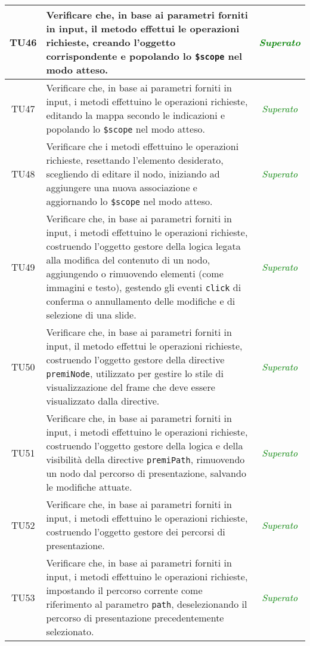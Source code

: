 \begin{longtable}{|c|>{}m{8cm}|c|}
\hypertarget{TU46}{TU46} & Verificare che, in base ai parametri forniti in input, il metodo effettui le operazioni richieste, creando l'oggetto corrispondente e popolando lo \texttt{\$scope} nel modo atteso\finaleTestUnita{}. & \textcolor{Green}{\textit{Superato}}\\ \hline
\hypertarget{TU47}{TU47} & Verificare che, in base ai parametri forniti in input, i metodi effettuino le operazioni richieste, editando la mappa secondo le indicazioni e popolando lo \texttt{\$scope} nel modo atteso\finaleTestUnita{}. & \textcolor{Green}{\textit{Superato}}\\ \hline
\hypertarget{TU48}{TU48} & Verificare che i metodi effettuino le operazioni richieste, resettando l'elemento desiderato, scegliendo di editare il nodo, iniziando ad aggiungere una nuova associazione e aggiornando lo \texttt{\$scope} nel modo atteso\finaleTestUnita{}. & \textcolor{Green}{\textit{Superato}}\\ \hline
\hypertarget{TU49}{TU49} & Verificare che, in base ai parametri forniti in input, i metodi effettuino le operazioni richieste, costruendo l'oggetto gestore della logica legata alla modifica del contenuto di un nodo, aggiungendo o rimuovendo elementi (come immagini e testo), gestendo gli eventi \texttt{click} di conferma o annullamento delle modifiche e di selezione di una slide\finaleTestUnita{}. & \textcolor{Green}{\textit{Superato}}\\ \hline
\hypertarget{TU50}{TU50} & Verificare che, in base ai parametri forniti in input, il metodo effettui le operazioni richieste, costruendo l'oggetto gestore della directive \texttt{premiNode}, utilizzato per gestire lo stile di visualizzazione del frame che deve essere visualizzato dalla directive\finaleTestUnita{}. & \textcolor{Green}{\textit{Superato}}\\ \hline
\hypertarget{TU51}{TU51} & Verificare che, in base ai parametri forniti in input, i metodi effettuino le operazioni richieste, costruendo l'oggetto gestore della logica e della visibilità della directive \texttt{premiPath}, rimuovendo un nodo dal percorso di presentazione, salvando le modifiche attuate\finaleTestUnita{}. & \textcolor{Green}{\textit{Superato}}\\ \hline
\hypertarget{TU52}{TU52} & Verificare che, in base ai parametri forniti in input, i metodi effettuino le operazioni richieste, costruendo l'oggetto gestore dei percorsi di presentazione\finaleTestUnita{}. & \textcolor{Green}{\textit{Superato}}\\ \hline
\hypertarget{TU53}{TU53} & Verificare che, in base ai parametri forniti in input, i metodi effettuino le operazioni richieste, impostando il percorso corrente come riferimento al parametro \texttt{path}, deselezionando il percorso di presentazione precedentemente selezionato\finaleTestUnita{}. & \textcolor{Green}{\textit{Superato}}\\ \hline

\end{longtable}
